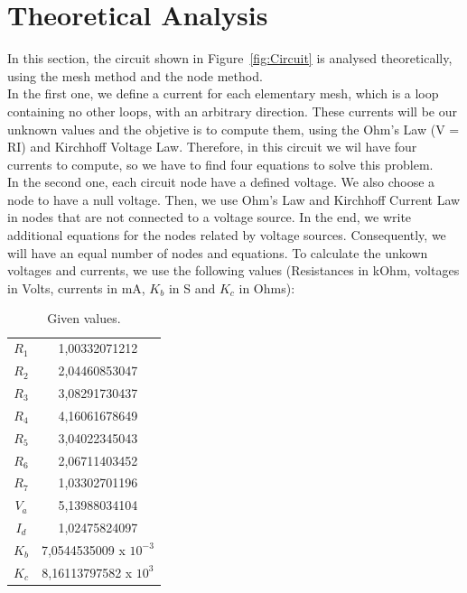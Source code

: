 \newpage
\section{Theoretical Analysis}
\label{sec:analysis}
In this section, the circuit shown in Figure~\ref{fig:Circuit} is analysed
theoretically, using the mesh method and the node method. \\
In the first one, we define a current for each elementary mesh, 
which is a loop containing no other loops, with an arbitrary direction.
These currents will be our unknown values and the objetive is to compute them, using the Ohm's Law (V = RI) and Kirchhoff Voltage Law. 
Therefore, in this circuit we wil have four currents to compute, so we have to find four equations to solve this problem. \\
\noindent In the second one, each circuit node have a defined voltage. We also choose a node to have a null voltage.
Then, we use Ohm's Law and Kirchhoff Current Law in nodes that are not connected to a voltage source.
In the end, we write additional equations for the nodes related by voltage sources.
Consequently, we will have an equal number of nodes and equations.
To calculate the unkown voltages and currents, we use the following values (Resistances in kOhm, voltages in Volts, currents in mA, $K_b$ in S and $K_c$ in Ohms):
\begin{table}[h!]
\centering
\begin{small}
\caption{Given values.} \label{Table1}
\begin{tabular}{c|c}
\hline
$R_1$ & 1,00332071212 \\
$R_2$  & 2,04460853047 \\
$R_3$  & 3,08291730437 \\
$R_4$ & 4,16061678649 \\
$R_5$  & 3,04022345043 \\
$R_6$ & 2,06711403452 \\
$R_7$ & 1,03302701196 \\
$V_a$ & 5,13988034104\\
$I_d$ & 1,02475824097 \\
$K_b$ & 7,0544535009 x $10^{-3}$ \\
$K_c$ & 8,16113797582 x $10^3$\\
\hline
\end{tabular}
\end{small}
\end{table}

\newpage


